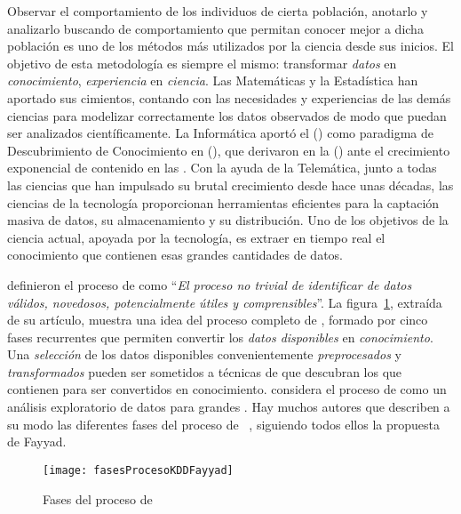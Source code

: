 
Observar el comportamiento de los individuos de cierta población, anotarlo y analizarlo buscando \patrones de comportamiento que permitan conocer mejor a dicha población es uno de los métodos más utilizados por la ciencia desde sus inicios. El objetivo de esta metodología es siempre el mismo: transformar \textsl{datos} en \textsl{conocimiento}, \textsl{experiencia} en \textsl{ciencia}. Las Matemáticas y la Estadística han aportado sus cimientos, contando con las necesidades y experiencias de las demás ciencias para modelizar correctamente los datos observados de modo que puedan ser analizados científicamente. La Informática aportó el \kdd (\KDD) como paradigma de Descubrimiento de Conocimiento en \dbs (\DB), que derivaron en la \dm (\DM) ante el crecimiento exponencial de contenido en las \DB. Con la ayuda de la Telemática, junto a todas las ciencias que han impulsado su brutal crecimiento desde hace unas décadas, las ciencias de la tecnología proporcionan herramientas eficientes para la captación masiva de datos, su almacenamiento y su distribución. Uno de los objetivos de la ciencia actual, apoyada por la tecnología, es extraer en tiempo real el conocimiento que contienen esas grandes cantidades de datos.

\citet{FayyadPiatetskySmyth-FromDataMiningToKnowledgeDiscoveryInDatabases-1996} definieron el proceso de \kdd como "`\emph{El proceso no trivial de identificar \patrones de datos válidos, novedosos, potencialmente útiles y comprensibles}"'. La figura~\ref{fig:fasesProcesoKDDFayyad}, extraída de su artículo, muestra una idea del proceso completo de \KDD, formado por cinco fases recurrentes que permiten convertir los \textsl{datos disponibles} en \textsl{conocimiento}. Una \textsl{selección} de los datos disponibles convenientemente \textsl{preprocesados} y \textsl{transformados} pueden ser sometidos a técnicas de \dm que descubran los \patrones que contienen para ser convertidos en conocimiento. \citet{Friedman-DataMiningAndStatisticsWhatIsTheConnection-1997} considera el proceso de \KDD como un análisis exploratorio de datos para grandes \dbs. Hay muchos autores que describen a su modo las diferentes fases del proceso de \KDD~\citep{RokachMaimon-DataMiningWithDecisionTreesTheoryAndApplications2nd-2014}, siguiendo todos ellos la propuesta de Fayyad.
\begin{figure}[htbp]
	\centering
		\texttt{[image: fasesProcesoKDDFayyad]}
	\caption{Fases del proceso de \KDD [Fayyad et al. (1996)]}
	\label{fig:fasesProcesoKDDFayyad}
\end{figure}

